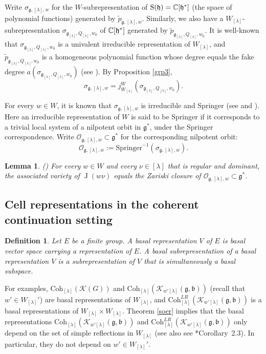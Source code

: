 \documentclass[12pt,a4paper]{amsart}
\newcommand{\CK}{{\mathcal {K}}}
\newcommand{\CO}{{\mathcal {O}}}
\newcommand{\oJ}{\operatorname{J}}
\newcommand{\oS}{\operatorname{S}}
\newcommand{\g}{\mathfrak g}
\newcommand{\h}{\mathfrak h}
\renewcommand{\b}{\mathfrak b}
\newcommand{\be}{\begin {equation}}
\newcommand{\ee}{\end {equation}}
\numberwithin{equation}{section}
\newtheorem{lem}[thm]{Lemma}
\newtheorem{defn}[thm]{Definition}
\theoremstyle{remark}
\def\Coh{\mathrm{Coh}}
\newcommand{\Lam}{{[\lambda]}}
\begin{document}
Write $\sigma_{\g,\Lam,w}$ for the $W$-subrepresentation of $\oS(\h)=\C[\h^*]$ (the space of polynomial functions) generated by $\tilde p_{\g,\Lam,w}$.
Similarly, we also have a $W_\Lam$-subrepresentation  $\sigma_{\g_\Lam,Q_\Lam,w_0}$ of $\C[\h^*]$  generated by   $\tilde p_{\g_\Lam,Q_\Lam,w_0}$. It is well-known that $\sigma_{\g_\Lam,Q_\Lam,w_0}$ is a univalent irreducible representation of $W_\Lam$, and $\tilde p_{\g_\Lam,Q_\Lam,w_0}$ is a homogeneous polynomial function whose degree equals the fake degree $a(\sigma_{\g_\Lam,Q_\Lam,w_0})$ (see \cite[Theorem 5.4]{J2}). By Proposition  \ref{grp3},
\be\label{jind0}
\sigma_{\g,\Lam,w}
=  j_{W_\Lam}^W(\sigma_{\g_\Lam,Q_\Lam,w_0}).
\ee



For every $w\in W$, it is known that $\sigma_{\g,\Lam,w}$ is irreducible and Springer (see \cite{Ho} and \cite[Section 2.10]{J.av}).  Here an irreducible representation of $W$ is said to be Springer if it corresponds to a trivial local system of a nilpotent orbit in $\g^*$, under the Springer correspondence. Write $\CO_{\g, \Lam,w}\subset \g^*$ for the corresponding nilpotent orbit:
\begin{equation*} %
\CO_{\g, \Lam,w} :=\mathrm{Springer}^{-1}(\sigma_{\g,\Lam,w}).
\end{equation*}

\begin{lem}\label{associatedv} (\cite[Theorem 3.9]{J.av})
For every $w\in W$ and every $\nu \in \Lam$ that is regular and dominant, the associated variety of $\oJ(w\nu)$ equals the Zariski closure of $\CO_{\g, \Lam,w}\subset \g^*$.
\end{lem}



\subsection{Cell representations in the coherent continuation setting}\label{seccell}

\begin{defn}
Let $E$ be a  finite group. A basal representation $V$ of $E$ is basal vector space carrying a representation of $E$. A basal subrepresentation of a basal representation $V$ is a subrepresentation of $V$ that is simultaneously a basal subspace.
\end{defn}

For examples, $ \Coh_{\Lam}( \CK(G))$ and $ \Coh_{\Lam}( \CK_{w'\Lam}(\g,\b))$ (recall that $w'\in W_\Lam'$) are basal representations of $W_\Lam$, and $ \Coh^{LR}_{\Lam}( \CK_{w'\Lam}(\g,\b))$ is a basal representations of $W_\Lam\times W_\Lam$. Theorem \ref{soer} implies that the basal representations  $  \Coh_{\Lam}( \CK_{w'\Lam}(\g,\b))$ and  $\Coh^{LR}_{\Lam}( \CK_{w'\Lam}(\g,\b))$ only depend on the set of simple reflections in $W_\Lam$ (see also  see \cite{BV2}*{Corollary~2.3}). In particular, they do not depend on $w'\in W_\Lam'$.
\end{document}
